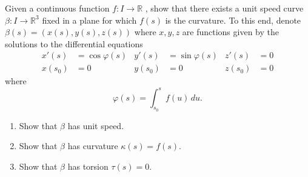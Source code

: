 \documentclass[12 pt, letterpaper]{hmcpset}
\begin{document}
\begin{problem}[Problem 3.]
	Given a continuous function $f : I \to \mathbb{R}$ , show that there exists a unit speed curve $\beta : I \to \mathbb{R}^{3}$  fixed in a plane for which $f(s)$  is the curvature. To this end, denote $\beta(s) = (x(s), y(s), z(s))$  where $x, y, z$  are functions given by the solutions to the differential equations
	\begin{align*}
		x'(s) & = \cos{\varphi(s)} & y'(s) & = \sin{\varphi(s)} & z'(s) & = 0 \\
		x(s_{0}) & = 0 & y(s_{0}) & = 0 & z(s_{0}) & = 0
	\end{align*}
	where
	\[
		\varphi(s) = \int_{s_{0}}^{s} f(u) \, du.
	\]
	\begin{enumerate}
		\item Show that $\beta$ has unit speed.
		\item Show that $\beta$ has curvature $\kappa(s) = f(s)$.
		\item Show that $\beta$ has torsion $\tau(s) = 0$.
	\end{enumerate}
\end{problem}
\end{document}
